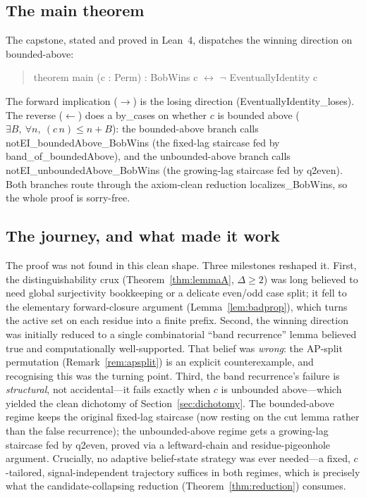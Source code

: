 \documentclass{article}
\newcommand{\us}{\discretionary{}{}{}\_\discretionary{}{}{}}
\newcommand{\lean}[1]{{\small\ttfamily #1}}
\begin{document}
\subsection{The main theorem}

The capstone, stated and proved in Lean~4, dispatches the winning
direction on bounded-above:

\begin{quote}
\lean{theorem main (c : Perm) : BobWins c $\leftrightarrow$ $\lnot$ EventuallyIdentity c}
\end{quote}

The forward implication ($\to$) is the losing direction
(\lean{EventuallyIdentity\us loses}). The reverse ($\leftarrow$) does a
\lean{by\us cases} on whether $c$ is bounded above
($\exists B,\ \forall n,\ (c\,n)\le n+B$): the bounded-above branch calls
\lean{notEI\us boundedAbove\us BobWins} (the fixed-lag staircase fed by
\lean{band\us of\us boundedAbove}), and the unbounded-above branch calls
\lean{notEI\us unboundedAbove\us BobWins} (the growing-lag staircase fed
by \lean{q2even}). Both branches route through the axiom-clean reduction
\lean{localizes\us BobWins}, so the whole proof is \lean{sorry}-free.

\subsection{The journey, and what made it work}

The proof was not found in this clean shape. Three milestones reshaped it.
First, the distinguishability crux (Theorem~\ref{thm:lemmaA},
$\Delta\ge2$) was long believed to need global surjectivity bookkeeping or
a delicate even/odd case split; it fell to the elementary forward-closure
argument (Lemma~\ref{lem:badprop}), which turns the active set on each
residue into a finite prefix. Second, the winning direction was initially
reduced to a single combinatorial ``band recurrence'' lemma believed true
and computationally well-supported. That belief was \emph{wrong}: the
AP-split permutation (Remark~\ref{rem:apsplit}) is an explicit
counterexample, and recognising this was the turning point. Third, the
band recurrence's failure is \emph{structural}, not accidental---it fails
exactly when $c$ is unbounded above---which yielded the clean dichotomy of
Section~\ref{sec:dichotomy}. The bounded-above regime keeps the original
fixed-lag staircase (now resting on the cut lemma rather than the false
recurrence); the unbounded-above regime gets a growing-lag staircase fed
by \lean{q2even}, proved via a leftward-chain and residue-pigeonhole
argument. Crucially, no adaptive belief-state strategy was ever
needed---a fixed, $c$-tailored, signal-independent trajectory suffices in
both regimes, which is precisely what the candidate-collapsing reduction
(Theorem~\ref{thm:reduction}) consumes.
\end{document}
